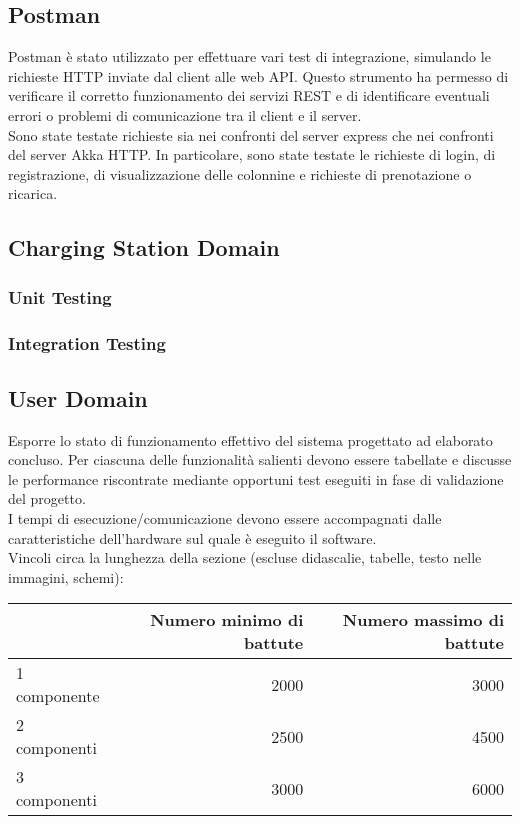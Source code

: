 \subsection{Postman}
Postman è stato utilizzato per effettuare vari test di integrazione, simulando le richieste
HTTP inviate dal client alle web API. Questo strumento ha permesso di verificare il corretto
funzionamento dei servizi REST e di identificare eventuali errori o problemi di comunicazione
tra il client e il server.\\

Sono state testate richieste sia nei confronti del server express che nei confronti del server
Akka HTTP. In particolare, sono state testate le richieste di login, di registrazione,
di visualizzazione delle colonnine e richieste di prenotazione o ricarica.\\



\subsection{Charging Station Domain}
\subsubsection{Unit Testing}
\subsubsection{Integration Testing}

\subsection{User Domain}

Esporre lo stato di funzionamento effettivo del sistema progettato ad elaborato concluso. Per ciascuna delle funzionalità salienti devono essere tabellate e discusse le performance riscontrate mediante opportuni test eseguiti in fase di validazione del progetto.\\

I tempi di esecuzione/comunicazione devono essere accompagnati dalle caratteristiche dell'hardware sul quale è eseguito il software.\\


Vincoli circa la lunghezza della sezione (escluse didascalie, tabelle, testo nelle immagini, schemi):

\vspace{1cm}
\begin{tabular}{l|rr}
                 & Numero minimo di battute & Numero massimo di battute \\
    \hline
    1 componente & 2000                     & 3000                      \\
    2 componenti & 2500                     & 4500                      \\
    3 componenti & 3000                     & 6000                      \\
    \hline
\end{tabular}


\newpage